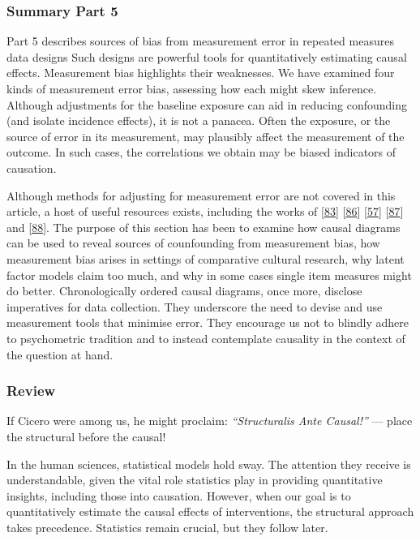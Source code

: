 \documentclass[
  singlecolumn]{article}
\begin{document}
\hypertarget{summary-part-5}{%
\subsubsection{Summary Part 5}\label{summary-part-5}}

Part 5 describes sources of bias from measurement error in repeated
measures data designs Such designs are powerful tools for quantitatively
estimating causal effects. Measurement bias highlights their weaknesses.
We have examined four kinds of measurement error bias, assessing how
each might skew inference. Although adjustments for the baseline
exposure can aid in reducing confounding (and isolate incidence
effects), it is not a panacea. Often the exposure, or the source of
error in its measurement, may plausibly affect the measurement of the
outcome. In such cases, the correlations we obtain may be biased
indicators of causation.

Although methods for adjusting for measurement error are not covered in
this article, a host of useful resources exists, including the works of
{[}\protect\hyperlink{ref-keogh2020}{83}{]}
{[}\protect\hyperlink{ref-buonaccorsi2010}{86}{]}
{[}\protect\hyperlink{ref-shi2021}{57}{]}
{[}\protect\hyperlink{ref-valeri2014}{87}{]} and
{[}\protect\hyperlink{ref-bandalos2018}{88}{]}. The purpose of this
section has been to examine how causal diagrams can be used to reveal
sources of counfounding from measurement bias, how measurement bias
arises in settings of comparative cultural research, why latent factor
models claim too much, and why in some cases single item measures might
do better. Chronologically ordered causal diagrams, once more, disclose
imperatives for data collection. They underscore the need to devise and
use measurement tools that minimise error. They encourage us not to
blindly adhere to psychometric tradition and to instead contemplate
causality in the context of the question at hand.

\hypertarget{review}{%
\subsubsection{Review}\label{review}}

If Cicero were among us, he might proclaim: \emph{``Structuralis Ante
Causal!''} --- place the structural before the causal!

In the human sciences, statistical models hold sway. The attention they
receive is understandable, given the vital role statistics play in
providing quantitative insights, including those into causation.
However, when our goal is to quantitatively estimate the causal effects
of interventions, the structural approach takes precedence. Statistics
remain crucial, but they follow later.
\end{document}

